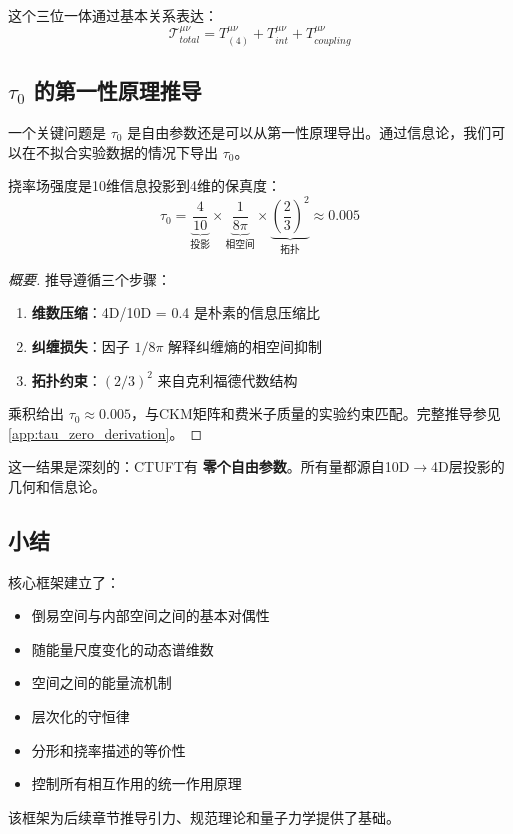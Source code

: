 这个三位一体通过基本关系表达：
\begin{equation}
    \boxed{\mathcal{T}^{\mu\nu}_{total} = T^{\mu\nu}_{(4)} + T^{\mu\nu}_{int} + T^{\mu\nu}_{coupling}}
\end{equation}

\subsection{$\tau_0$ 的第一性原理推导}

一个关键问题是 $\tau_0$ 是自由参数还是可以从第一性原理导出。通过信息论，我们可以在不拟合实验数据的情况下导出 $\tau_0$。

\begin{theorem}
挠率场强度是10维信息投影到4维的保真度：
\begin{equation}
    \tau_0 = \underbrace{\frac{4}{10}}_{\text{投影}} \times \underbrace{\frac{1}{8\pi}}_{\text{相空间}} \times \underbrace{\left(\frac{2}{3}\right)^2}_{\text{拓扑}} \approx 0.005
\end{equation}
\end{theorem}

\begin{proof}[概要]
推导遵循三个步骤：
\begin{enumerate}
    \item \textbf{维数压缩}：4D/10D = 0.4 是朴素的信息压缩比
    \item \textbf{纠缠损失}：因子 $1/8\pi$ 解释纠缠熵的相空间抑制
    \item \textbf{拓扑约束}：$(2/3)^2$ 来自克利福德代数结构
\end{enumerate}
乘积给出 $\tau_0 \approx 0.005$，与CKM矩阵和费米子质量的实验约束匹配。完整推导参见 \cref{app:tau_zero_derivation}。
\end{proof}

这一结果是深刻的：CTUFT有 \textbf{零个自由参数}。所有量都源自10D$\to$4D层投影的几何和信息论。

\subsection{小结}

核心框架建立了：
\begin{itemize}
    \item 倒易空间与内部空间之间的基本对偶性
    \item 随能量尺度变化的动态谱维数
    \item 空间之间的能量流机制
    \item 层次化的守恒律
    \item 分形和挠率描述的等价性
    \item 控制所有相互作用的统一作用原理
\end{itemize}

该框架为后续章节推导引力、规范理论和量子力学提供了基础。
